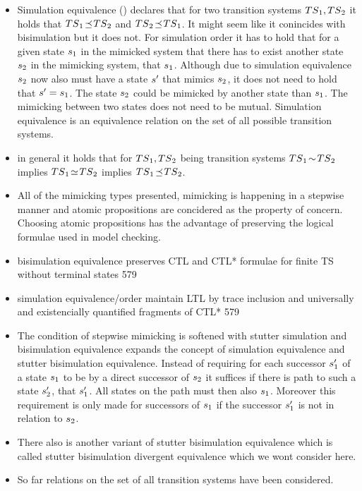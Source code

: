 \documentclass[preview]{standalone}
\begin{document}
\begin{itemize}
	\item Simulation equivalence (\simequiv) declares that for two transition systems ${TS}_1, {TS}_2$ it holds that ${TS}_1 {\;\!\preceq\;\!} {TS}_2$ and ${TS}_2 {\;\!\preceq\;\!} {TS}_1$. It might seem like it conincides with bisimulation but it does not. For simulation order it has to hold that for a given state ${s}_1$ in the mimicked system that there has to exist another state ${s}_2$ in the mimicking system, that \stmimicsN ${s}_1$. Although due to simulation equivalence ${s}_2$ now also must have a state ${s}'$ that mimics ${s}_2$, it does not need to hold that ${s}' = {s}_1$. The state ${s}_2$ could be mimicked by another state than ${s}_1$. The mimicking between two states does not need to be mutual. Simulation equivalence is an equivalence relation on the set of all possible transition systems.
	\item in general it holds that for ${TS}_1, {TS}_2$ being transition systems ${TS}_1 {\;\!\sim\;\!} {TS}_2$ implies ${TS}_1 {\;\!\simeq\;\!} {TS}_2$ implies ${TS}_1 {\;\!\preceq\;\!} {TS}_2$.
	\item All of the mimicking types presented, mimicking is happening in a stepwise manner and atomic propositions are concidered as the property of concern. Choosing atomic propositions has the advantage of preserving the logical formulae used in model checking.	
	\item bisimulation equivalence preserves CTL and CTL* formulae for finite TS without terminal states 579
	\item simulation equivalence/order maintain LTL by trace inclusion and universally and existencially quantified fragments of CTL*  579
	\item The condition of stepwise mimicking is softened with stutter simulation and bisimulation equivalence expands the concept of simulation equivalence and stutter bisimulation equivalence. Instead of requiring for each successor ${s}_1'$ of a state ${s}_1$ to be \stmimickedN by a direct successor of ${s}_2$ it suffices if there is path to such a state ${s}_2'$, that \stmimicsN ${s}_1'$. All states on the path must then also \stmimicN ${s}_1$. Moreover this requirement is only made for successors of ${s}_1$ if the successor ${s}_1'$ is not in relation to ${s}_2$. 
	\item There also is another variant of stutter bisimulation equivalence which is called stutter bisimulation divergent equivalence which we wont consider here.
	\item So far relations on the set of all transition systems have been considered. 

\end{itemize}
\end{document}

